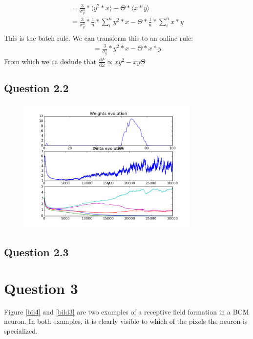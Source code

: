 \begin{align*}
	= \frac{3}{\sigma_y^3} * \langle y^2 * x \rangle - \Theta * \langle x * y \rangle \\
	= \frac{3}{\sigma_y^3} * \frac{1}{n} * \sum_{i}^{n} y^2*x - \Theta * \frac{1}{n} * \sum_{i}^{n} x * y \\
\end{align*}
This is the batch rule. We can transform this to an online rule:
\begin{align*}
	= \frac{3}{\sigma_y^3} * y^2*x - \Theta * x * y
\end{align*}
From which we ca dedude that $\frac{\mathrm{d}F}{\mathrm{d}\omega} \propto x y^2 - x y\Theta$

\subsection{Question 2.2}

\begin{figure}[H]
 \centering
 \includegraphics[width = 0.8\textwidth]{../results/exercise222}
 \caption{}
 \label{fig:bild1}
\end{figure}

\subsection{Question 2.3}


\section{Question 3}

Figure \ref{bil4} and \ref{bild3} are two examples of a receptive field formation in a BCM neuron. In both examples, it is clearly visible to which of the pixels the neuron is specialized.

